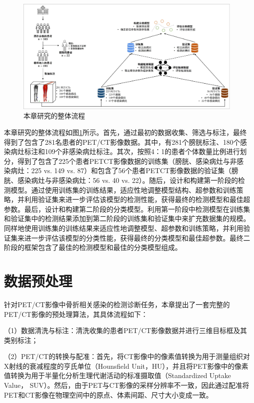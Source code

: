 \begin{figure}[htbp]
  \centering
  \includegraphics[width=\textwidth]{figures/chap04_study.jpg}
  \caption{本章研究的整体流程}
  \label{fig:chap04_study}
\end{figure}

本章研究的整体流程如图\ref{fig:chap04_study}所示。首先，通过最初的数据收集、筛选与标注，最终得到了包含了281名患者的PET/CT影像数据。其中，有281个膀胱标注、180个感染病灶标注和109个非感染病灶标注。其次，按照4：1的患者个体数量比例进行划分，得到了包含了225个患者PETCT影像数据的训练集（膀胱、感染病灶与非感染病灶：225 vs. 149 vs. 87）和包含了56个患者PETCT影像数据的验证集（膀胱、感染病灶与非感染病灶：56 vs. 40 vs. 22）。随后，设计和构建第一阶段的检测模型。通过使用训练集的训练结果，适应性地调整模型结构、超参数和训练策略，并利用验证集来进一步评估该模型的检测性能，获得最终的检测模型和最佳超参数。最后，设计和构建第二阶段的分类模型。利用第一阶段中检测模型在训练集和验证集中的检测结果添加到第二阶段的训练集和验证集中来扩充数据集的规模。同样地使用训练集的训练结果来适应性地调整模型、超参数和训练策略，并利用验证集来进一步评估该模型的分类性能，获得最终的分类模型和最佳超参数。最终二阶段的框架包含了最佳的检测模型和最佳的分类模型组成。

\section{数据预处理}

针对PET/CT影像中骨折相关感染的检测诊断任务，本章提出了一套完整的PET/CT影像的预处理算法，其具体流程如下：

（1）数据清洗与标注：清洗收集的患者PET/CT影像数据并进行三维目标框及其类别标注；

（2）PET/CT的转换与配准：首先，将CT影像中的像素值转换为用于测量组织对X射线的衰减程度的亨氏单位（Hounsfield Unit，HU），并且将PET影像中的像素值转换为用于半量化分析生理代谢活动的标准摄取值（Standardized Uptake Value， SUV）。然后，由于PET与CT影像的采样分辨率不一致，因此通过配准将PET和CT影像在物理空间中的原点、体素间距、尺寸大小变成一致。

